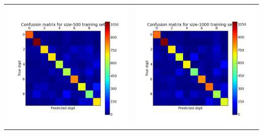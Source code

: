 \documentclass[11pt]{article}
\begin{document}
\begin{tabular}{cc}
\includegraphics[scale=0.5]{images/confusion_matrix_500} & \includegraphics[scale=0.5]{images/confusion_matrix_1000}
\end{tabular}
\end{document}
